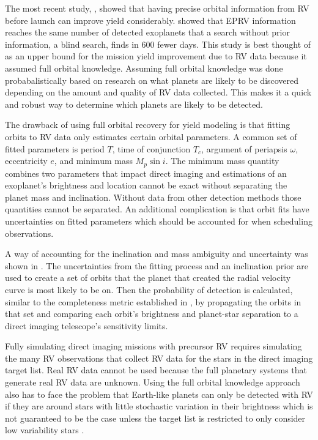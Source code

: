 The most recent study, \citet{morganExplorationExpectedNumber2022a}, showed
that having precise orbital information from RV before launch can improve yield
considerably. \citet{morganExplorationExpectedNumber2022a} showed that EPRV
information reaches the same number of detected exoplanets that a search
without prior information, a blind search, finds in 600 fewer days. This study
is best thought of as an upper bound for the mission yield improvement due to
RV data because it assumed full orbital knowledge. Assuming full orbital
knowledge was done probabalistically based on research on what planets are
likely to be discovered depending on the amount and quality of RV data
collected. This makes it a quick and robust way to determine which planets are
likely to be detected.

The drawback of using full orbital recovery for yield modeling is that fitting
orbits to RV data only estimates certain orbital parameters. A common set of
fitted parameters is period $T$, time of conjunction $T_c$, argument of
periapsis $\omega$, eccentricity $e$, and minimum mass $M_p \sin{i}$. The
minimum mass quantity combines two parameters that impact direct imaging and
estimations of an exoplanet's brightness and location cannot be exact without
separating the planet mass and inclination. Without data from other detection
methods those quantities cannot be separated. An additional complication is
that orbit fits have uncertainties on fitted parameters which should be
accounted for when scheduling observations.

A way of accounting for the inclination and mass ambiguity and uncertainty was
shown in . The uncertainties from the fitting
process and an inclination prior are used to create a set of orbits that the
planet that created the radial velocity curve is most likely to be on. Then the
probability of detection is calculated, similar to the completeness metric
established in \citet{Brown2005d}, by propagating the orbits in that set and
comparing each orbit's brightness and planet-star separation to a direct
imaging telescope's sensitivity limits.

Fully simulating direct imaging missions with precursor RV requires simulating
the many RV observations that collect RV data for the stars in the direct
imaging target list. Real RV data cannot be used because the full planetary
systems that generate real RV data are unknown. Using the full orbital
knowledge approach also has to face the problem that Earth-like planets can
only be detected with RV if they are around stars with little stochastic
variation in their brightness which is not guaranteed to be the case unless the
target list is restricted to only consider low variability stars
\citep{Crass2021}.

